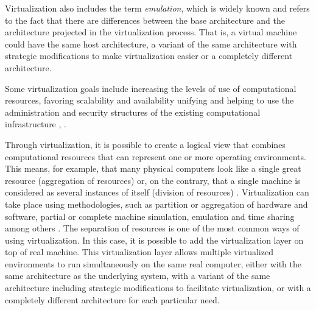 	Virtualization also includes the term \textit{emulation}, which is widely known and refers to the fact that there are differences between the base architecture and the architecture projected in the virtualization process. That is, a virtual machine could have the same host architecture, a variant of the same architecture with strategic modifications to make virtualization easier or a completely different architecture.
	
	
	
	Some virtualization goals include increasing the levels of use of computational resources, favoring scalability and availability unifying and helping to use the administration and security structures of the existing computational infrastructure \cite{Kusnetzky2011}, \cite{Hui2014}.
	
	
	Through virtualization, it is possible to create a logical view that combines computational resources that can represent one or more operating environments. This means, for example, that many physical computers look like a single great resource (aggregation of resources) or, on the contrary, that a single machine is considered as several instances of itself (division of resources) \cite{Silberschatz2014}. Virtualization can take place using methodologies, such as partition or aggregation of hardware and software, partial or complete machine simulation, emulation and time sharing among others \cite{Chiueh2005, Hoopes2009}. The separation of resources is one of the most common ways of using virtualization. In this case, it is possible to add the virtualization layer on top of real machine. This virtualization layer allows multiple virtualized environments to run simultaneously on the same real computer, either with the same architecture as the underlying system, with a variant of the same architecture including strategic modifications to facilitate virtualization, or with a completely different architecture for each particular need.
 

